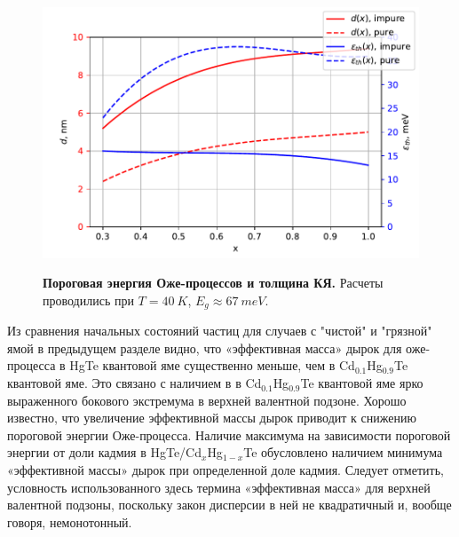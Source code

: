 \documentclass[../main.tex]{subfiles}
\begin{document}
    \begin{figure}[h]
    \vspace{0.75cm}
    \begin{minipage}[h]{\linewidth}
        \begin{center}
            \includegraphics[width=1\linewidth]{./images/de_vs_x.pdf}

            \vspace{0.75cm}
            \textbf{Пороговая энергия Оже-процессов и толщина КЯ.}
            Расчеты проводились при $T= 40~K$, $E_g \approx 67~meV$.
            \vspace{1.25cm}
        \end{center}
    \end{minipage}
    \end{figure}

    Из сравнения начальных состояний частиц для случаев с "чистой" и "грязной" ямой в предыдущем разделе видно, 
    что «эффективная масса» дырок для оже-процесса в HgTe квантовой яме 
    существенно меньше, чем в Cd${}_{0.1}$Hg${}_{0.9}$Te квантовой яме. Это связано с наличием в в Cd${}_{0.1}$Hg${}_{0.9}$Te квантовой яме ярко выраженного бокового 
    экстремума в верхней валентной подзоне. Хорошо известно, что увеличение эффективной массы дырок приводит к снижению пороговой энергии 
    Оже-процесса. Наличие максимума на зависимости пороговой энергии от доли кадмия в HgTe/Cd${}_{x}$Hg${}_{1-x}$Te обусловлено наличием минимума 
    «эффективной массы» дырок при определенной доле кадмия. Следует отметить, условность использованного здесь термина «эффективная масса» 
    для верхней валентной подзоны, поскольку закон дисперсии в ней не квадратичный и, вообще говоря, немонотонный.
\end{document}

